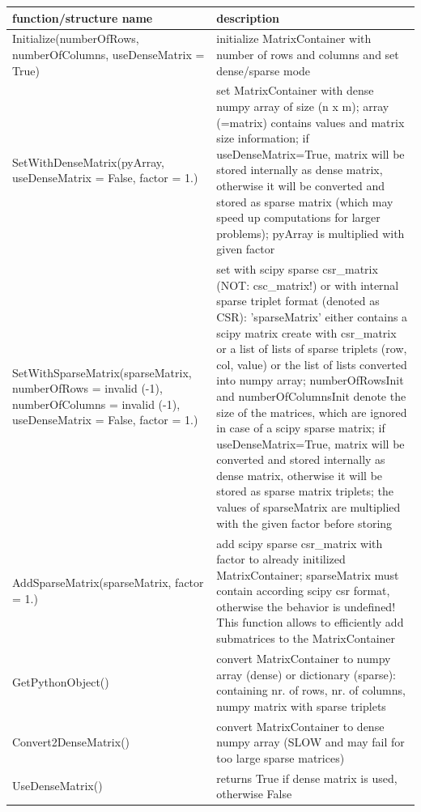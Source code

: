 \begin{center}
\footnotesize
\begin{longtable}{| p{8cm} | p{8cm} |} 
\hline
{\bf function/structure name} & {\bf description}\\ \hline
  Initialize(numberOfRows, numberOfColumns, useDenseMatrix = True) & initialize MatrixContainer with number of rows and columns and set dense/sparse mode\\ \hline 
  SetWithDenseMatrix(pyArray, useDenseMatrix = False, factor = 1.) & set MatrixContainer with dense numpy array of size (n x m); array (=matrix) contains values and matrix size information; if useDenseMatrix=True, matrix will be stored internally as dense matrix, otherwise it will be converted and stored as sparse matrix (which may speed up computations for larger problems); pyArray is multiplied with given factor\\ \hline 
  SetWithSparseMatrix(sparseMatrix, numberOfRows = invalid (-1), numberOfColumns = invalid (-1), useDenseMatrix = False, factor = 1.) & set with scipy sparse csr\_matrix (NOT: csc\_matrix!) or with internal sparse triplet format (denoted as CSR): 'sparseMatrix' either contains a scipy matrix create with csr\_matrix or a list of lists of sparse triplets (row, col, value) or the list of lists converted into numpy array; numberOfRowsInit and numberOfColumnsInit denote the size of the matrices, which are ignored in case of a scipy sparse matrix; if useDenseMatrix=True, matrix will be converted and stored internally as dense matrix, otherwise it will be stored as sparse matrix triplets; the values of sparseMatrix are multiplied with the given factor before storing\\ \hline 
  AddSparseMatrix(sparseMatrix, factor = 1.) & add scipy sparse csr\_matrix with factor to already initilized MatrixContainer; sparseMatrix must contain according scipy csr format, otherwise the behavior is undefined! This function allows to efficiently add submatrices to the MatrixContainer\\ \hline 
  GetPythonObject() & convert MatrixContainer to numpy array (dense) or dictionary (sparse): containing nr. of rows, nr. of columns, numpy matrix with sparse triplets\\ \hline 
  Convert2DenseMatrix() & convert MatrixContainer to dense numpy array (SLOW and may fail for too large sparse matrices)\\ \hline 
  UseDenseMatrix() & returns True if dense matrix is used, otherwise False\\ \hline 

\end{longtable}
\end{center}
